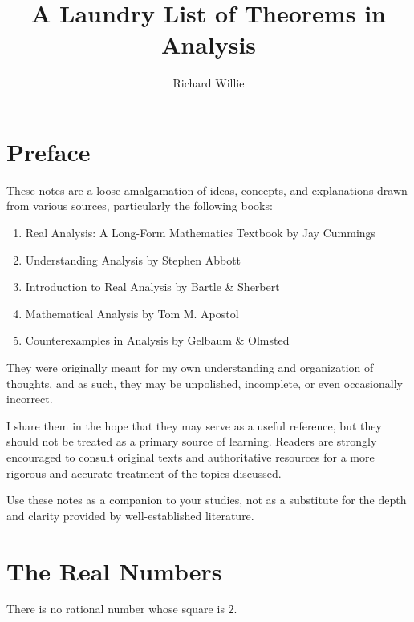 \documentclass[11pt,twoside=off,numbers=noenddot]{scrbook}
\title{A Laundry List of Theorems in Analysis}
\author{Richard Willie}
\begin{document}
\maketitle

\chapter*{Preface}
These notes are a loose amalgamation of ideas, concepts, and
explanations drawn from various sources, particularly the following books:
\begin{enumerate}
  \item Real Analysis: A Long-Form Mathematics Textbook by Jay
    Cummings \cite{cummings2019real}
  \item Understanding Analysis by Stephen Abbott \cite{abbott2015understanding}
  \item Introduction to Real Analysis by Bartle \& Sherbert
    \cite{bartle2011introduction}
  \item Mathematical Analysis by Tom M. Apostol \cite{apostol1974mathematical}
  \item Counterexamples in Analysis by Gelbaum \& Olmsted
    \cite{gelbaum2003counterexamples}
\end{enumerate}
They were originally meant for my own understanding and organization
of thoughts, and as such, they may be unpolished, incomplete, or even
occasionally incorrect.

I share them in the hope that they may serve as a useful reference,
but they should not be treated as a primary source of learning.
Readers are strongly encouraged to consult original texts and
authoritative resources for a more rigorous and accurate treatment of
the topics discussed.

Use these notes as a companion to your studies, not as a substitute
for the depth and clarity provided by well-established literature.

\tableofcontents

\chapter{The Real Numbers}
\begin{theorem}
  There is no rational number whose square is $2$.
\end{theorem}
\end{document}

